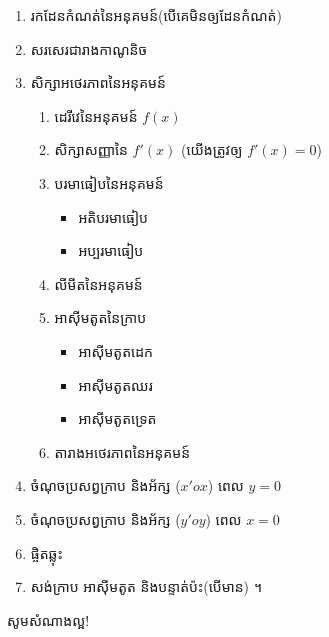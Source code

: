 \documentclass[a4paper, 12pt]{exam}
\begin{document}
	\begin{enumerate}[1]
		\item រកដែនកំណត់នៃអនុគមន៍(បើគេមិនឲ្យដែនកំណត់)
		\item សរសេរជារាងកាណូនិច
		\item សិក្សាអថេរភាពនៃអនុគមន៍
		\begin{enumerate}[a]
			\item ដេរីវេនៃអនុគមន៍ $f(x)$
			\item សិក្សាសញ្ញានៃ $f'(x)$ (យើងត្រូវឲ្យ $f'(x)=0$)
			\item បរមាធៀបនៃអនុគមន៍
			\begin{itemize}
				\item អតិបរមាធៀប
				\item អប្បរមាធៀប
			\end{itemize}
			\item លីមីតនៃអនុគមន៍
			\item អាស៊ីមតូតនៃក្រាប
			\begin{itemize}
				\item អាស៊ីមតូតដេក
				\item អាស៊ីមតូតឈរ
				\item អាស៊ីមតូតទ្រេត
			\end{itemize}
			\item តារាងអថេរភាពនៃអនុគមន៍
		\end{enumerate}
		\item ចំណុចប្រសព្វក្រាប និងអ័ក្ស ($x'ox$) ពេល $y=0$
		\item ចំណុចប្រសព្វក្រាប និងអ័ក្ស ($y'oy$) ពេល $x=0$
		\item ផ្ចិតឆ្លុះ
		\item សង់ក្រាប អាស៊ីមតូត និងបន្ទាត់ប៉ះ(បើមាន) ។
	\end{enumerate}
\begin{center}
	\sffamily\color{black}
	សូមសំណាងល្អ!
\end{center}\newpage
\end{document}
